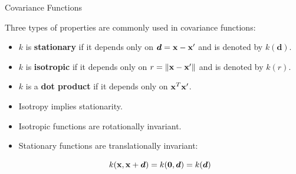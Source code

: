 \begin{frame}[c]{Covariance Functions}

Three types of properties are commonly used in covariance functions:

\lz

\begin{itemize}
\item $k$ is \textbf{stationary} if it depends only on $\bm{d} =\mathbf{x} -\mathbf{x}^\prime$ and is denoted by $k(\bm{d})$.

\item $k$ is \textbf{isotropic} if it depends only on $r = \|\mathbf{x} - \mathbf{x}^\prime\|$ and is denoted by $k(r)$.

\item $k$ is a \textbf{dot product} if it depends only on $\mathbf{x}^T \mathbf{x}^\prime$.
\end{itemize}

\lz
\lz

\begin{itemize}
\item[\faLightbulbO] Isotropy implies stationarity.
\item[\faLightbulbO] Isotropic functions are rotationally invariant.
\item[\faLightbulbO] Stationary functions are translationally invariant:
\vspace{-.3cm}

$$k(\mathbf{x},\mathbf{x} + \bm{d}) = k(\bm{0},\bm{d})=k(\bm{d})$$
\end{itemize}

\end{frame}

